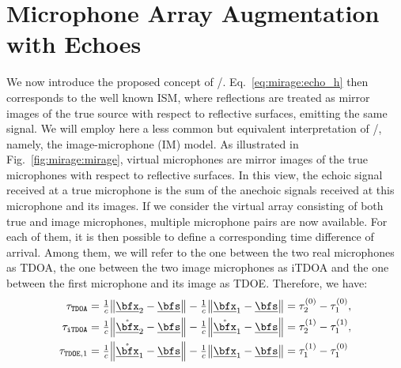 \section{Microphone Array Augmentation with Echoes}\label{sec:mirage:mirage}
We now introduce the proposed concept of \MIRAGEdef/.
Eq.~\cref{eq:mirage:echo_h} then corresponds to the well known \acf{ISM}, where reflections are treated as mirror images of the true source with respect to reflective surfaces, emitting the same signal.
We will employ here a less common but equivalent interpretation of \ISM/, namely, the image-microphone (IM) model. As illustrated in Fig.~\cref{fig:mirage:mirage}, virtual microphones are mirror images of the true microphones with respect to reflective surfaces.
In this view, the echoic signal received at a true microphone is the sum of the anechoic signals received at this microphone and its images.
If we consider the virtual array consisting of both true and image microphones, multiple microphone pairs are now available. For each of them, it is then possible to define a corresponding time difference of arrival.
Among them, we will refer to the one between the two real microphones as \ac{TDOA}, the one between the two image microphones as \ac{iTDOA} and the one between the first microphone and its image as \ac{TDOE}.
Therefore, we have:%
\begin{align}
\tau_\mathtt{TDOA}  &= \tfrac{1}{c} \norm{\positionMicrophone_2 - \positionSource} - \tfrac{1}{c} \norm{\positionMicrophone_1 - \positionSource} = \tau_2^{(0)} - \tau_1^{(0)},\\
\tau_\mathtt{iTDOA} &= \tfrac{1}{c} \norm{\mathring{\positionMicrophone}_2 - \positionSource} - \tfrac{1}{c} \norm{\mathring{\positionMicrophone}_1 - \positionSource} = \tau_2^{(1)} - \tau_1^{(1)},\\
\tau_{\mathtt{TDOE},1}  &= \tfrac{1}{c} \norm{\mathring{\positionMicrophone}_1 - \positionSource} - \tfrac{1}{c} \norm{\positionMicrophone_1 - \positionSource} = \tau_1^{(1)} - \tau_1^{(0)}\\
\end{align}
